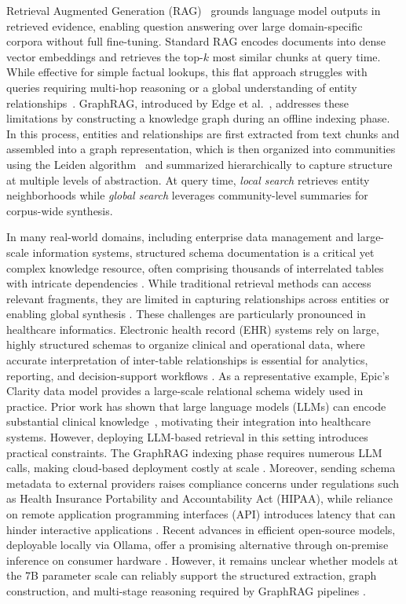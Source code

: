 \documentclass{article}
\begin{document}
Retrieval Augmented Generation (RAG)~\cite{lewis2020retrieval} grounds language model outputs in retrieved evidence, enabling question answering over large domain-specific corpora without full fine-tuning. Standard RAG encodes documents into dense vector embeddings and retrieves the top-$k$ most similar chunks at query time. While effective for simple factual lookups, this flat approach struggles with queries requiring multi-hop reasoning or a global understanding of entity relationships~\cite{edge2024local}. GraphRAG, introduced by Edge et al.~\cite{edge2024local}, addresses these limitations by constructing a knowledge graph during an offline indexing phase. In this process, entities and relationships are first extracted from text chunks and assembled into a graph representation, which is then organized into communities using the Leiden algorithm~\cite{traag2019louvain} and summarized hierarchically to capture structure at multiple levels of abstraction. At query time, \emph{local search} retrieves entity neighborhoods while \emph{global search} leverages community-level summaries for corpus-wide synthesis.

In many real-world domains, including enterprise data management and large-scale information systems, structured schema documentation is a critical yet complex knowledge resource, often comprising thousands of interrelated tables with intricate dependencies \cite{halevy2005enterprise, stonebraker2018end}. While traditional retrieval methods can access relevant fragments, they are limited in capturing relationships across entities or enabling global synthesis \cite{lewis2020retrieval,edge2024local,gao2023retrieval}. These challenges are particularly pronounced in healthcare informatics. Electronic health record (EHR) systems rely on large, highly structured schemas to organize clinical and operational data, where accurate interpretation of inter-table relationships is essential for analytics, reporting, and decision-support workflows \cite{hripcsak2015observational}. As a representative example, Epic's Clarity data model provides a large-scale relational schema widely used in practice. Prior work has shown that large language models (LLMs) can encode substantial clinical knowledge~\cite{singhal2023large}, motivating their integration into healthcare systems. However, deploying LLM-based retrieval in this setting introduces practical constraints. The GraphRAG indexing phase requires numerous LLM calls, making cloud-based deployment costly at scale \cite{achiam2023gpt,zhao2023survey}. Moreover, sending schema metadata to external providers raises compliance concerns under regulations such as Health Insurance Portability and Accountability Act (HIPAA), while reliance on remote application programming interfaces (API) introduces latency that can hinder interactive applications \cite{price2019privacy,patterson2021carbon, zhao2023survey}. Recent advances in efficient open-source models, deployable locally via Ollama, offer a promising alternative through on-premise inference on consumer hardware \cite{grattafiori2024llama,yang2025qwen3}. However, it remains unclear whether models at the 7B parameter scale can reliably support the structured extraction, graph construction, and multi-stage reasoning required by GraphRAG pipelines \cite{edge2024local}.
\end{document}
